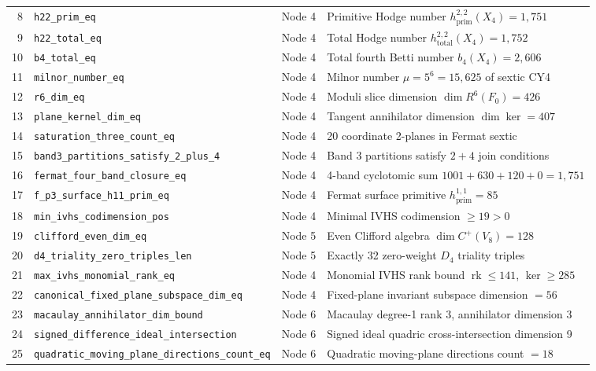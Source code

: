 \documentclass[11pt,a4paper]{article}
\theoremstyle{definition}
\theoremstyle{remark}
\DeclareMathOperator{\rk}{rk}
\begin{document}
{\begin{longtable}{r >{\ttfamily\scriptsize}p{6.4cm} l p{6.8cm}}
8 & \texttt{h22\_prim\_eq} & Node 4 & Primitive Hodge number $h^{2,2}_{\mathrm{prim}}(X_4) = 1,751$ \\
9 & \texttt{h22\_total\_eq} & Node 4 & Total Hodge number $h^{2,2}_{\mathrm{total}}(X_4) = 1,752$ \\
10 & \texttt{b4\_total\_eq} & Node 4 & Total fourth Betti number $b_4(X_4) = 2,606$ \\
11 & \texttt{milnor\_number\_eq} & Node 4 & Milnor number $\mu = 5^6 = 15,625$ of sextic CY4 \\
12 & \texttt{r6\_dim\_eq} & Node 4 & Moduli slice dimension $\dim R^6(F_0) = 426$ \\
13 & \texttt{plane\_kernel\_dim\_eq} & Node 4 & Tangent annihilator dimension $\dim\ker = 407$ \\
14 & \texttt{saturation\_three\_count\_eq} & Node 4 & 20 coordinate 2-planes in Fermat sextic \\
15 & \texttt{band3\_partitions\_satisfy\_2\_plus\_4} & Node 4 & Band 3 partitions satisfy $2+4$ join conditions \\
16 & \texttt{fermat\_four\_band\_closure\_eq} & Node 4 & 4-band cyclotomic sum $1001+630+120+0 = 1,751$ \\
17 & \texttt{f\_p3\_surface\_h11\_prim\_eq} & Node 4 & Fermat surface primitive $h^{1,1}_{\mathrm{prim}} = 85$ \\
18 & \texttt{min\_ivhs\_codimension\_pos} & Node 4 & Minimal IVHS codimension $\ge 19 > 0$ \\
19 & \texttt{clifford\_even\_dim\_eq} & Node 5 & Even Clifford algebra $\dim C^+(V_8) = 128$ \\
20 & \texttt{d4\_triality\_zero\_triples\_len} & Node 5 & Exactly 32 zero-weight $D_4$ triality triples \\
21 & \texttt{max\_ivhs\_monomial\_rank\_eq} & Node 4 & Monomial IVHS rank bound $\rk \le 141$, $\ker \ge 285$ \\
22 & \texttt{canonical\_fixed\_plane\_subspace\_dim\_eq} & Node 4 & Fixed-plane invariant subspace dimension $= 56$ \\
23 & \texttt{macaulay\_annihilator\_dim\_bound} & Node 6 & Macaulay degree-1 rank 3, annihilator dimension 3 \\
24 & \texttt{signed\_difference\_ideal\_intersection} & Node 6 & Signed ideal quadric cross-intersection dimension 9 \\
25 & \texttt{quadratic\_moving\_plane\_directions\_count\_eq} & Node 6 & Quadratic moving-plane directions count $= 18$ \\

\end{longtable}}
\end{document}
